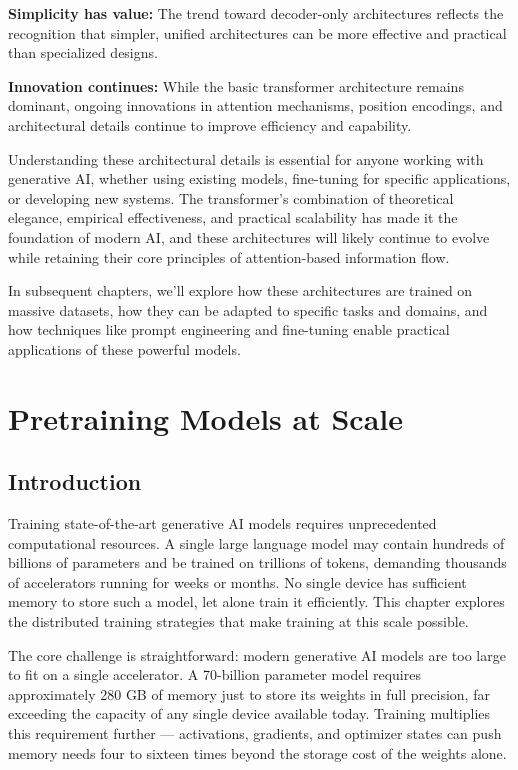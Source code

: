 \documentclass{book}
\begin{document}
\textbf{Simplicity has value:} The trend toward decoder-only architectures reflects the recognition that simpler, unified architectures can be more effective and practical than specialized designs.

\textbf{Innovation continues:} While the basic transformer architecture remains dominant, ongoing innovations in attention mechanisms, position encodings, and architectural details continue to improve efficiency and capability.

Understanding these architectural details is essential for anyone working with generative AI, whether using existing models, fine-tuning for specific applications, or developing new systems. The transformer's combination of theoretical elegance, empirical effectiveness, and practical scalability has made it the foundation of modern AI, and these architectures will likely continue to evolve while retaining their core principles of attention-based information flow.

In subsequent chapters, we'll explore how these architectures are trained on massive datasets, how they can be adapted to specific tasks and domains, and how techniques like prompt engineering and fine-tuning enable practical applications of these powerful models.

\chapter{Pretraining Models at Scale}
\label{ch:pretraining}

\section{Introduction}
\label{sec:pretraining_intro}

Training state-of-the-art generative AI models requires unprecedented
computational resources. A single large language model may contain hundreds
of billions of parameters and be trained on trillions of tokens, demanding
thousands of accelerators running for weeks or months. No single device has
sufficient memory to store such a model, let alone train it efficiently. This
chapter explores the distributed training strategies that make training at
this scale possible.

The core challenge is straightforward: modern generative AI models are too
large to fit on a single accelerator. A 70-billion parameter model requires
approximately 280 GB of memory just to store its weights in full precision,
far exceeding the capacity of any single device available today. Training
multiplies this requirement further --- activations, gradients, and optimizer
states can push memory needs four to sixteen times beyond the storage cost of
the weights alone.
\end{document}
